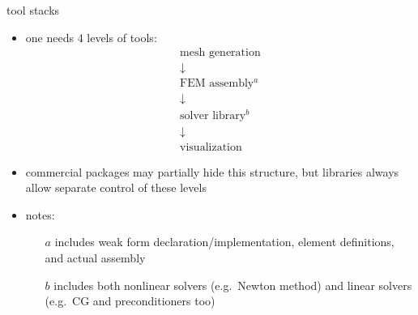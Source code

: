 \documentclass[hide notes,intlimits,usenames,dvipsnames]{beamer}
\begin{document}
\begin{frame}{tool stacks}

\begin{itemize}
\item one needs 4 levels of tools:
    $$\begin{matrix} \text{mesh generation} \\ \downarrow \\ \text{FEM assembly$^a$} \\ \downarrow \\ \text{solver library$^b$} \\ \downarrow \\ \text{visualization} \end{matrix}$$
\item commercial packages may partially hide this structure, but libraries always allow separate control of these levels
\item notes:
    \begin{enumerate}
    \item[$a$] includes weak form declaration/implementation, element definitions, and actual assembly
    \item[$b$] includes both nonlinear solvers (e.g.~Newton method) and linear solvers (e.g.~CG and preconditioners too)
    \end{enumerate}
\end{itemize}
\end{frame}
\end{document}
